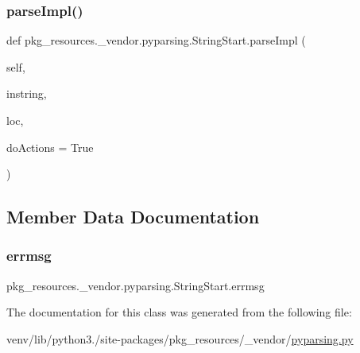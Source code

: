 \subsubsection{\texorpdfstring{parse\+Impl()}{parseImpl()}}
{\footnotesize\ttfamily def pkg\+\_\+resources.\+\_\+vendor.\+pyparsing.\+String\+Start.\+parse\+Impl (\begin{DoxyParamCaption}\item[{}]{self,  }\item[{}]{instring,  }\item[{}]{loc,  }\item[{}]{do\+Actions = {\ttfamily True} }\end{DoxyParamCaption})}



\subsection{Member Data Documentation}
\mbox{\label{classpkg__resources_1_1__vendor_1_1pyparsing_1_1StringStart_af0230225970611c98a0d6c8dd177bdde}} 
\subsubsection{\texorpdfstring{errmsg}{errmsg}}
{\footnotesize\ttfamily pkg\+\_\+resources.\+\_\+vendor.\+pyparsing.\+String\+Start.\+errmsg}



The documentation for this class was generated from the following file\+:\begin{DoxyCompactItemize}
\item 
venv/lib/python3./site-\/packages/pkg\+\_\+resources/\+\_\+vendor/\hyperlink{pkg__resources_2__vendor_2pyparsing_8py}{pyparsing.\+py}\end{DoxyCompactItemize}

